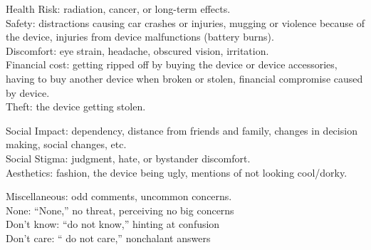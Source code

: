 \documentclass{acm_proc_article-sp}
\begin{document}
Health Risk: radiation, cancer, or long-term effects.\\
Safety: distractions causing car crashes or injuries, mugging or violence because of the device, injuries from device malfunctions (battery burns).\\
Discomfort: eye strain, headache, obscured vision, irritation. \\
Financial cost: getting ripped off by buying the device or device accessories, having to buy another device when broken or stolen, financial compromise caused by device. \\
Theft: the device getting stolen. 

Social Impact: dependency, distance from friends and family, changes in decision making, social changes, etc. \\
Social Stigma: judgment, hate, or bystander discomfort.\\ 
Aesthetics: fashion, the device being ugly, mentions of not looking cool/dorky. 

Miscellaneous: odd comments, uncommon concerns. \\
None: ``None,'' no threat, perceiving no big concerns \\
Don't know: ``do not know,'' hinting at confusion \\
Don't care: `` do not care,'' nonchalant answers 



\balancecolumns

\end{document}
